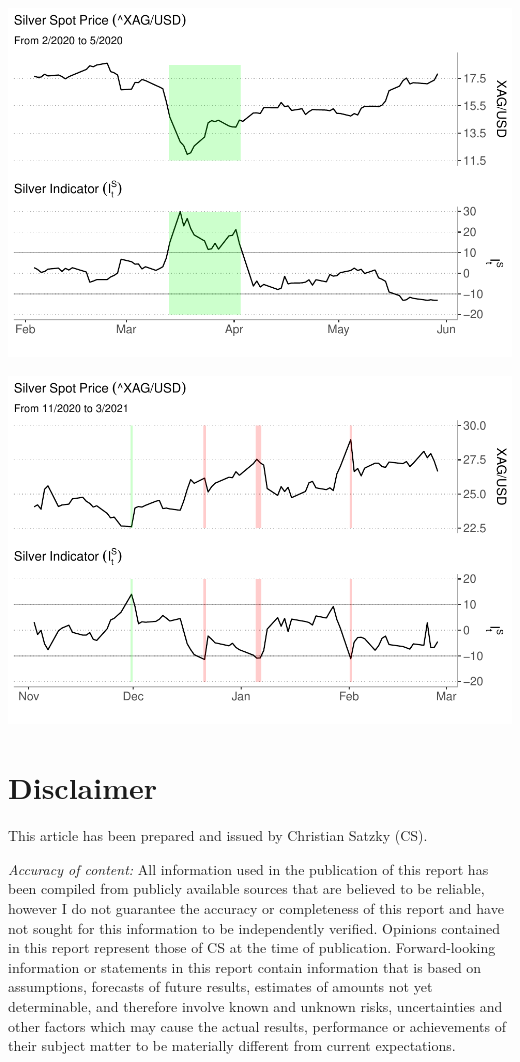 \documentclass[
  12pt,
]{article}
\begin{document}
\includegraphics{silver-market-timing_files/figure-latex/highlighted-plot3-1.pdf}

\includegraphics{silver-market-timing_files/figure-latex/highlighted-plot5-1.pdf}

\newpage

\hypertarget{disclaimer}{%
\section{Disclaimer}\label{disclaimer}}

This article has been prepared and issued by Christian Satzky (CS).

\emph{Accuracy of content:} All information used in the publication of
this report has been compiled from publicly available sources that are
believed to be reliable, however I do not guarantee the accuracy or
completeness of this report and have not sought for this information to
be independently verified. Opinions contained in this report represent
those of CS at the time of publication. Forward-looking information or
statements in this report contain information that is based on
assumptions, forecasts of future results, estimates of amounts not yet
determinable, and therefore involve known and unknown risks,
uncertainties and other factors which may cause the actual results,
performance or achievements of their subject matter to be materially
different from current expectations.
\end{document}
